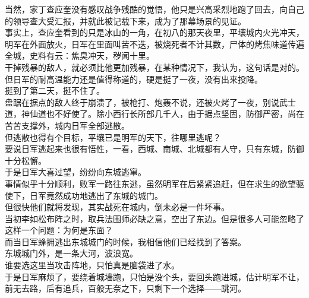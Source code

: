 \begin{multicols}{\theparacolNo}
当然，家丁查应奎没有感叹战争残酷的觉悟，他只是兴高采烈地跑了回去，向自己的领导查大受汇报，并就此被记载下来，成为了那幕场景的见证。\\

事实上，查应奎看到的只是冰山的一角，在初八的那天夜里，平壤城内火光冲天，明军在外面放火，日军在里面叫苦不迭，被烧死者不计其数，尸体的烤焦味道传遍全城，史料有云：焦臭冲天，秽闻十里。\\

干掉残暴的敌人，就必须比他更加残暴，在某种情况下，我认为，这句话是对的。\\

但日军的耐高温能力还是值得称道的，硬是挺了一夜，没有出来投降。\\

挺到了第二天，挺不住了。\\

盘踞在据点的敌人终于崩溃了，被枪打、炮轰不说，还被火烤了一夜，别说武士道，神仙道也不好使了。除小西行长所部几千人，由于据点坚固，防御严密，尚在苦苦支撑外，城内日军全部逃散。\\

但逃散也得有个目标，平壤已是明军的天下，往哪里逃呢？\\

要说日军逃起来也很有悟性，一看，西城、南城、北城都有人守，只有东城，防御十分松懈。\\

于是日军大喜过望，纷纷向东城逃窜。\\

事情似乎十分顺利，败军一路往东逃，虽然明军在后紧紧追赶，但在求生的欲望驱使下，日军竟然成功地逃出了东城的城门。\\

但很快他们就将发现，其实战死在城内，倒未必是一件坏事。\\

当初李如松布阵之时，取兵法围师必缺之意，空出了东边。但是很多人可能忽略了这样一个问题：为何是东面？\\

而当日军蜂拥逃出东城城门的时候，我相信他们已经找到了答案。\\

东城城门外，是一条大河，波浪宽。\\

谁要选这里当攻击阵地，只怕真是脑袋进了水。\\

于是日军麻烦了，要绕着城墙跑，只怕是没个头，要回头跑进城，估计明军不让，前无去路，后有追兵，百般无奈之下，只剩下一个选择——跳河。\\


\end{multicols}
